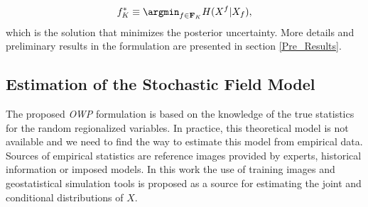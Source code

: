 \begin{equation} \label{eq:Meth_Theo_OWP_minH}
f_{K}^{*} \equiv \argmin_{f \in \mathbf{F}_K} H(X^f|X_{f}) ,
\end{equation}
which is the solution that minimizes the posterior uncertainty. More details and preliminary results in the formulation are presented in section \ref{Pre_Results}.

























































































\subsection{Estimation of the Stochastic Field Model}
\label{sec_Meth_iOSP}

The proposed \emph{OWP} formulation is based on the knowledge of the true statistics for the random regionalized variables. In practice, this theoretical model is not available and we need to find the way to estimate this model from empirical data. Sources of empirical statistics are reference images provided by experts, historical information or imposed models. In this work the use of training images and geostatistical simulation tools is proposed as a source for estimating the joint and conditional distributions of $X$. 

